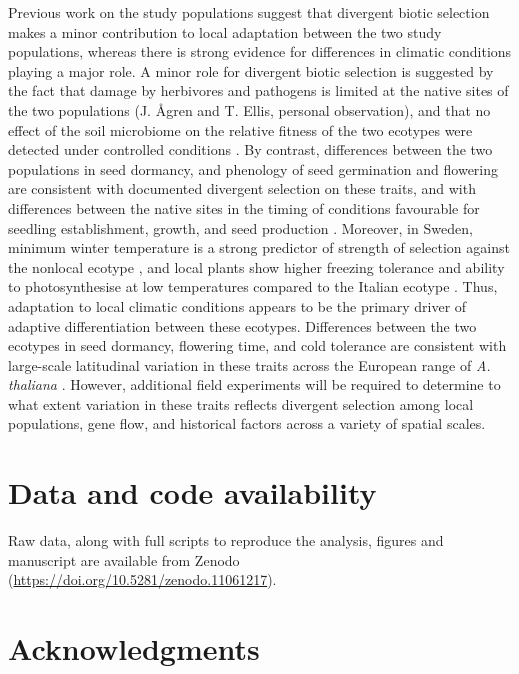 \documentclass[twocolumn,twoside,lettersize]{article}
\begin{document}
Previous work on the study populations suggest that divergent biotic selection makes a minor contribution to local adaptation between the two study populations, whereas there is strong evidence for differences in climatic conditions playing a major role. A minor role for divergent biotic selection is suggested by the fact that damage by herbivores and pathogens is limited at the native sites of the two populations (J. {\AA}gren and T. Ellis, personal observation), and that no effect of the soil microbiome on the relative fitness of the two ecotypes were detected under controlled conditions \cite{Duran2022-ha}. By contrast, differences between the two populations in seed dormancy, and phenology of seed germination and flowering are consistent with documented divergent selection on these traits, and with differences between the native sites in the timing of conditions favourable for seedling establishment, growth, and seed production \cite{Agren2017-ea, Postma2016-jj, Postma2018-ie}. Moreover, in Sweden, minimum winter temperature is a strong predictor of strength of selection against the nonlocal ecotype \cite{Agren2012-ga}, and local plants show higher freezing tolerance and ability to photosynthesise at low temperatures compared to the Italian ecotype \cite{Oakley2014-td, Oakley2018-eb, Lee2024-up}. Thus, adaptation to local climatic conditions appears to be the primary driver of adaptive differentiation between these ecotypes. Differences between the two ecotypes in seed dormancy, flowering time, and cold tolerance are consistent with large-scale latitudinal variation in these traits across the European range of \textit{A. thaliana} \cite{Debieu2013-nf, Martinez-Berdeja2020-fg, Stinchcombe2004-ig, Zacchello2022-xa, Zhen2008-fz}. However, additional field experiments will be required to determine to what extent variation in these traits reflects divergent selection among local populations, gene flow, and historical factors across a variety of spatial scales. 

\section*{Data and code availability}

Raw data, along with full scripts to reproduce the analysis, figures and manuscript are available from Zenodo (\url{https://doi.org/10.5281/zenodo.11061217}).

\section*{Acknowledgments}
\end{document}
